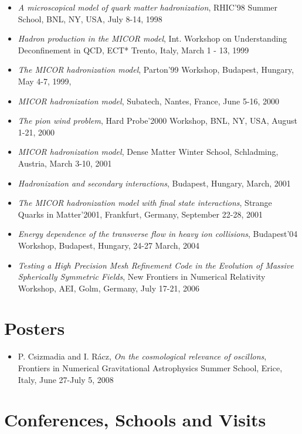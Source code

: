 \documentclass{article}[12pt]
\begin{document}
\begin{itemize}
\item {\it A microscopical model of quark matter hadronization},
      RHIC'98 Summer School, BNL, NY, USA, July 8-14, 1998
\item {\it Hadron production in the MICOR model},
      Int. Workshop on Understanding Deconfinement in QCD,
      ECT* Trento, Italy, March 1 - 13, 1999
\item {\it The MICOR hadronization model}, Parton'99 Workshop,
      Budapest, Hungary, May 4-7, 1999,
\item {\it MICOR hadronization model}, Subatech, Nantes, France, June 5-16, 2000
\item {\it The pion wind problem}, Hard Probe'2000 Workshop, BNL, NY, USA,
      August 1-21, 2000
\item {\it MICOR hadronization model}, Dense Matter Winter School, Schladming,
      Austria, March 3-10, 2001
\item {\it Hadronization and secondary interactions},
      Budapest, Hungary, March, 2001
\item {\it The MICOR hadronization model with final state interactions},
      Strange Quarks in Matter'2001, Frankfurt, Germany, September 22-28, 2001
\item {\it Energy dependence of the transverse flow in heavy ion collisions},
      Budapest'04 Workshop, Budapest, Hungary, 24-27 March, 2004
\item {\it Testing a High Precision Mesh Refinement Code in the Evolution of
      Massive Spherically Symmetric Fields},
      New Frontiers in Numerical Relativity Workshop,
      AEI, Golm, Germany, July 17-21, 2006
\end{itemize}

\section*{Posters}
\begin{itemize}
\item P. Csizmadia and I. R{\'a}cz,
      {\it On the cosmological relevance of oscillons},
      Frontiers in Numerical Gravitational Astrophysics Summer School,
      Erice, Italy, June 27-July 5, 2008
\end{itemize}

\section*{Conferences, Schools and Visits}
\end{document}
